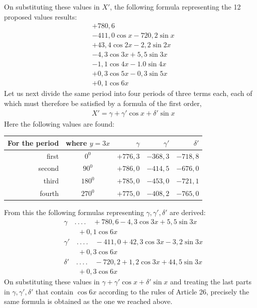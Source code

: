 On substituting these values in $X'$, the following formula representing the 12 proposed values results:
\[
\begin{aligned}
&+780{,}6\\[5pt]
&-411{,}0\cos x-720{,}2\sin x\\[5pt]
&+43{,}4\cos2x-2{,}2\sin2x\\[5pt]
&-4{,}3\cos3x+5{,}5\sin3x\\[5pt]
&-1{,}1\cos4x-1.0\sin4x\\[5pt]
&+0{,}3\cos5x-0{,}3\sin5x\\[5pt]
&+0{,}1\cos6x
\end{aligned}
\]
Let us next divide the same period into four periods of three terms each, each of which must therefore be satisfied by a formula of the first order,
\[
\begin{aligned}
&X'=\gamma+\gamma'\cos x+\delta'\sin x
\end{aligned}
\]
Here the following values are found:
\begin{center}
\begin{tabular}{r|c|r|r|r}
For the period & where $y=3x$ & $\gamma$ & $\gamma'$ & $\delta'$\\\hline
first & $0^{0}$ & $+776{,}3$ & $-368{,}3$ & $-718{,}8$\\
second & $90^{0}$ & $+786{,}0$ & $-414{,}5$ & $-676{,}0$\\
third & $180^{0}$ & $+785{,}0$ & $-453{,}0$ & $-721{,}1$\\
fourth & $270^{0}$ & $+775{,}0$ & $-408{,}2$ & $-765{,}0$
\end{tabular}
\end{center}
From this the following formulas representing $\gamma,\gamma',\delta'$ are derived:
\[
\begin{aligned}
&\gamma\quad.\,.\,.\,.\quad+780{,}6-4{,}3\cos3x+5{,}5\sin3x\\[5pt]
&\qquad{}+0{,}1\cos6x\\[5pt]
&\gamma'\quad.\,.\,.\,.\quad-411{,}0+42{,}3\cos3x-3{,}2\sin3x\\[5pt]
&\qquad{}+0{,}3\cos6x\\[5pt]
&\delta'\quad.\,.\,.\,.\quad-720{,}2+1{,}2\cos3x+44{,}5\sin3x\\[5pt]
&\qquad{}+0{,}3\cos6x
\end{aligned}
\]
On substituting these values in $\gamma+\gamma'\cos x+\delta'\sin x$ and treating the last parts in $\gamma,\gamma',\delta'$ that contain $\cos6x$ according to the rules of Article 26, precisely the same formula is obtained as the one we reached above.
\endgroup
